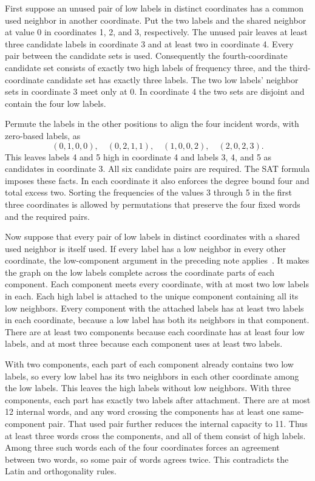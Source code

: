 \documentclass[11pt]{article}
\begin{document}
First suppose an unused pair of low labels in distinct coordinates
has a common used neighbor in another coordinate. Put the two
labels and the shared neighbor at value 0 in coordinates 1, 2,
and 3, respectively. The unused pair leaves at least three
candidate labels in coordinate 3 and at least two in coordinate 4.
Every pair between the candidate sets is used. Consequently
the fourth-coordinate candidate set consists of exactly two
high labels of frequency three, and the third-coordinate candidate
set has exactly three labels. The two low labels' neighbor sets
in coordinate 3 meet only at 0. In coordinate 4 the two sets
are disjoint and contain the four low labels.

Permute the labels in the other positions to align the four
incident words, with zero-based labels, as
\[
(0,1,0,0),\quad(0,2,1,1),\quad(1,0,0,2),\quad(2,0,2,3).
\]
This leaves labels 4 and 5 high in coordinate 4 and labels 3, 4,
and 5 as candidates in coordinate 3. All six candidate pairs
are required. The SAT formula imposes these facts. In each
coordinate it also enforces the degree bound four and total
excess two. Sorting the frequencies of the values 3 through 5
in the first three coordinates is allowed by permutations that
preserve the four fixed words and the required pairs.

Now suppose that every pair of low labels in distinct coordinates
with a shared used neighbor is itself used. If every label has
a low neighbor in every other coordinate, the low-component
argument in the preceding note applies~\cite[Section~3]{gap}.
It makes the graph on the low labels complete across the coordinate
parts of each component. Each component meets every coordinate,
with at most two low labels in each. Each high label is attached
to the unique component containing all its low neighbors.
Every component with the attached labels has at least two
labels in each coordinate, because a low label has both its
neighbors in that component. There are at least two components
because each coordinate has at least four low labels, and at
most three because each component uses at least two labels.

With two components, each part of each component already contains
two low labels, so every low label has its two neighbors in each
other coordinate among the low labels. This leaves the high labels
without low neighbors. With three components, each part has
exactly two labels after attachment. There are at most 12 internal
words, and any word crossing the components has at least one
same-component pair. That used pair further reduces the internal
capacity to 11. Thus at least three words cross the components,
and all of them consist of high labels. Among three such words
each of the four coordinates forces an agreement between two words,
so some pair of words agrees twice. This contradicts the Latin
and orthogonality rules.
\end{document}

